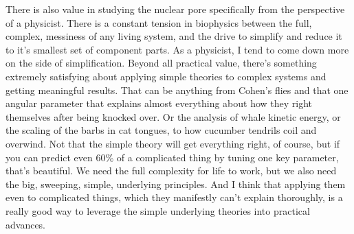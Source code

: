 
There is also value in studying the nuclear pore specifically from the perspective of a physicist.  There is a constant tension in biophysics between the full, complex, messiness of any living system, and the drive to simplify and reduce it to it's smallest set of component parts.  As a physicist, I tend to come down more on the side of simplification.  Beyond all practical value, there's something extremely satisfying about applying simple theories to complex systems and getting meaningful results.  That can be anything from Cohen's flies and that one angular parameter that explains almost everything about how they right themselves after being knocked over.  Or the analysis of whale kinetic energy, or the scaling of the barbs in cat tongues, to how cucumber tendrils coil and overwind.  Not that the simple theory will get everything right, of course, but if you can predict even 60\% of a complicated thing by tuning one key parameter, that's beautiful.  We need the full complexity for life to work, but we also need the big, sweeping, simple, underlying principles.  And I think that applying them even to complicated things, which they manifestly can't explain thoroughly, is a really good way to leverage the simple underlying theories into practical advances.

